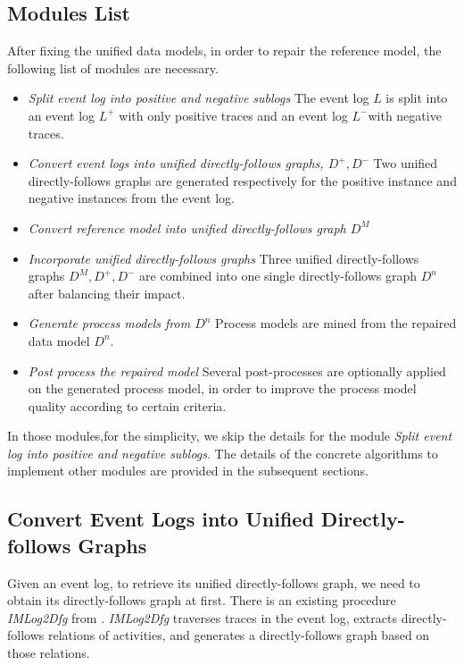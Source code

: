 \subsection{Modules List}
After fixing the unified data models, in order to repair the reference model, the following list of modules are necessary. 
\begin{itemize}
	\item \emph{Split event log into positive and negative sublogs } \quad
	The event log $L$ is split into an event log $L^+$ with only positive traces and an event log $L^-$with negative traces.
	\item \emph{Convert event logs into unified directly-follows graphs, $D^+, D^-$}\quad 
	Two unified directly-follows graphs are generated respectively for the positive instance and negative instances from the event log.
	\item \emph{Convert reference model into unified directly-follows graph $D^M$}\quad 
	\item \emph{Incorporate unified directly-follows graphs} \quad
	Three unified directly-follows  graphs $D^M, D^+, D^-$ are combined into one single directly-follows graph $D^n$ after balancing their impact.
	\item \emph{Generate process models from $D^n$} \quad
	Process models are mined from the repaired data model $D^n$.
	\item \emph{Post process the repaired model} \quad
	Several post-processes are optionally applied on the generated process model, in order to improve the process model quality according to certain criteria.
\end{itemize}
In those modules,for the simplicity, we skip the details for the module \emph{Split event log into positive and negative sublogs}. The details of the concrete algorithms to implement other modules are provided in the subsequent sections.
\subsection{Convert Event Logs into Unified Directly-follows Graphs}
Given an event log, to retrieve its unified directly-follows graph, we need to obtain its directly-follows graph at first. There is an existing procedure \emph{IMLog2Dfg} from \cite{leemans2013discovering}. \emph{IMLog2Dfg} traverses traces in the event log, extracts directly-follows relations of activities, and generates a directly-follows graph based on those relations. 

